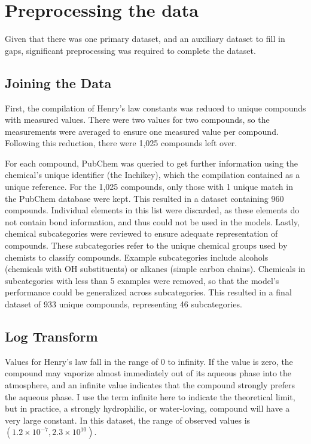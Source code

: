 \documentclass[12pt, oneside]{article}   	%
\begin{document}
\section{Preprocessing the data}
Given that there was one primary dataset, and an auxiliary dataset to fill in gaps, significant preprocessing was required to complete the dataset.

\subsection{Joining the Data}
First, the compilation of Henry's law constants was reduced to unique compounds with measured values. There were two values for two compounds, so the measurements were averaged to ensure one measured value per compound. Following this reduction, there were 1,025 compounds left over.

For each compound, PubChem was queried to get further information using the chemical's unique identifier (the Inchikey), which the compilation contained as a unique reference. For the 1,025 compounds, only those with 1 unique match in the PubChem database were kept. This resulted in a dataset containing 960 compounds. Individual elements in this list were discarded, as these elements do not contain bond information, and thus could not be used in the models. Lastly, chemical subcategories were reviewed to ensure adequate representation of compounds. These subcategories refer to the unique chemical groups used by chemists to classify compounds. Example subcategories include alcohols (chemicals with OH substituents) or alkanes (simple carbon chains). Chemicals in subcategories with less than 5 examples were removed, so that the model's performance could be generalized across subcategories. This resulted in a final dataset of 933 unique compounds, representing 46 subcategories. 

\subsection{Log Transform}
Values for Henry's law fall in the range of 0 to infinity. If the value is zero, the compound may vaporize almost immediately out of its aqueous phase into the atmosphere, and an infinite value indicates that the compound strongly prefers the aqueous phase. I use the term infinite here to indicate the theoretical limit, but in practice, a strongly hydrophilic, or water-loving, compound will have a very large constant. In this dataset, the range of observed values is $(1.2\times10^{-7}, 2.3\times 10^{10})$. %
\end{document}
